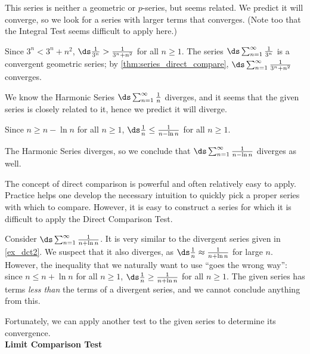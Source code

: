 {This series is neither a geometric or $p$-series, but seems related. We predict it will converge, so we look for a series with larger terms that converges. (Note too that the Integral Test seems difficult to apply here.)

Since $3^n < 3^n+n^2$, $\ds \frac1{3^n}> \frac1{3^n+n^2}$ for all $n\geq1$. The series $\ds\sum_{n=1}^\infty \frac{1}{3^n}$ is a convergent geometric series; by \autoref{thm:series_direct_compare}, $\ds \sum_{n=1}^\infty \frac1{3^n+n^2}$ converges.}

{We know the Harmonic Series $\ds\sum_{n=1}^\infty \frac1n$ diverges, and it seems that the given series is closely related to it, hence we predict it will diverge. 

Since $n\geq n-\ln n$ for all $n\geq 1$, $\ds \frac1n \leq \frac1{n-\ln n}$ for all $n\geq 1$. 

The Harmonic Series diverges, so we conclude that $\ds\sum_{n=1}^\infty \frac{1}{n-\ln n}$ diverges as well.}

The concept of direct comparison is powerful and often relatively easy to apply. Practice helps one develop the necessary intuition to quickly pick a proper series with which to compare. However, it is easy to construct a series for which it is difficult to apply the Direct Comparison Test.

Consider $\ds\sum_{n=1}^\infty \frac1{n+\ln n}$. It is very similar to the divergent series given in \autoref{ex_dct2}. We suspect that it also diverges, as $\ds \frac 1n \approx \frac1{n+\ln n}$ for large $n$. However, the inequality that we naturally want to use ``goes the wrong way'': since $n\leq n+\ln n$ for all $n\geq 1$, $\ds\frac1n \geq \frac{1}{n+\ln n}$ for all $n\geq 1$. The given series has terms \textit{less than} the terms of a divergent series, and we cannot conclude anything from this.

Fortunately, we can apply another test to the given series to determine its convergence.\\

\noindent\textbf{\large Limit Comparison Test}\\

